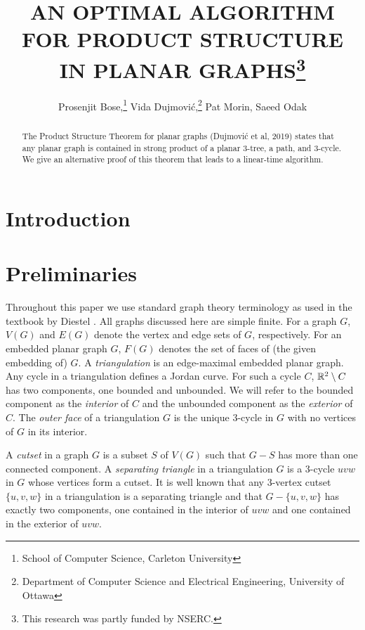\documentclass{patmorin}
\title{\MakeUppercase{An Optimal Algorithm for Product Structure in Planar Graphs}\thanks{This research was partly funded by NSERC.}}
\author{%
  Prosenjit Bose,\thanks{School of Computer Science, Carleton University}\qquad
  Vida Dujmović,\thanks{Department of Computer Science and Electrical Engineering, University of Ottawa}\qquad
  Pat Morin,\footnotemark[1]\qquad
  Saeed Odak\footnotemark[2]}
\date{}
\begin{document}
\maketitle

\begin{abstract}
  The Product Structure Theorem for planar graphs (Dujmović et al, 2019) states that any planar graph is contained in strong product of a planar $3$-tree, a path, and $3$-cycle.  We give an alternative proof of this theorem that leads to a linear-time algorithm.
\end{abstract}

%

\section{Introduction}

\section{Preliminaries}

Throughout this paper we use standard graph theory terminology as used in the textbook by Diestel \cite{diestel:graph}.  All graphs discussed here are simple finite.  For a graph $G$, $V(G)$ and $E(G)$ denote the vertex and edge sets of $G$, respectively.  For an embedded planar graph $G$, $F(G)$ denotes the set of faces of (the given embedding of) $G$.  A \emph{triangulation} is an edge-maximal embedded planar graph.  Any cycle in a triangulation defines a Jordan curve. For such a cycle $C$, $\mathbb{R}^2\setminus C$ has two components, one bounded and unbounded. We will refer to the bounded component as the \emph{interior} of $C$ and the unbounded component as the \emph{exterior} of $C$.  The \emph{outer face} of a triangulation $G$ is the unique $3$-cycle in $G$ with no vertices of $G$ in its interior.

A \emph{cutset} in a graph $G$ is a subset $S$ of $V(G)$ such that $G-S$ has more than one connected component.  A \emph{separating triangle} in a triangulation $G$ is a $3$-cycle $uvw$ in $G$ whose vertices form a cutset.  It is well known that any $3$-vertex cutset $\{u,v,w\}$ in a triangulation is a separating triangle and that $G-\{u,v,w\}$ has exactly two components, one contained in the interior of $uvw$ and one contained in the exterior of $uvw$.
\end{document}
